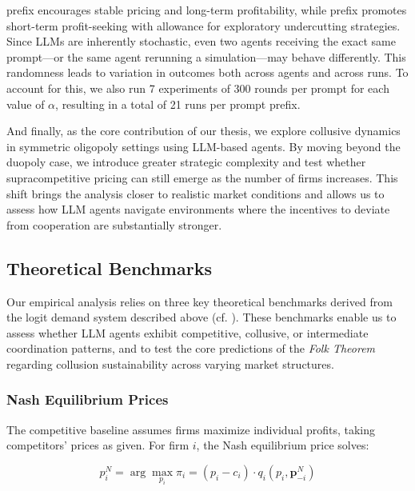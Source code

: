  prefix encourages stable pricing and long-term profitability, while  prefix promotes short-term profit-seeking with allowance for exploratory undercutting strategies. Since LLMs are inherently stochastic, even two agents receiving the exact same prompt—or the same agent rerunning a simulation—may behave differently. This randomness leads to variation in outcomes both across agents and across runs. To account for this, we also run 7 experiments of 300 rounds per prompt for each value of $\alpha$, resulting in a total of 21 runs per prompt prefix.


And finally, as the core contribution of our thesis, we explore collusive dynamics in symmetric oligopoly settings using LLM-based agents. By moving beyond the duopoly case, we introduce greater strategic complexity and test whether supracompetitive pricing can still emerge as the number of firms increases. This shift brings the analysis closer to realistic market conditions and allows us to assess how LLM agents navigate environments where the incentives to deviate from cooperation are substantially stronger.


\subsection{Theoretical Benchmarks}

Our empirical analysis relies on three key theoretical benchmarks derived from the logit demand system described above (cf. ). These benchmarks enable us to assess whether LLM agents exhibit competitive, collusive, or intermediate coordination patterns, and to test the core predictions of the \emph{Folk Theorem} regarding collusion sustainability across varying market structures.

\subsubsection*{Nash Equilibrium Prices}

The competitive baseline assumes firms maximize individual profits, taking competitors' prices as given. For firm $i$, the Nash equilibrium price solves:

\begin{equation}
    p_i^{N} = \arg\max_{p_i} \pi_i = (p_i - c_i) \cdot q_i(p_i, \mathbf{p}_{-i}^N)
\end{equation}

